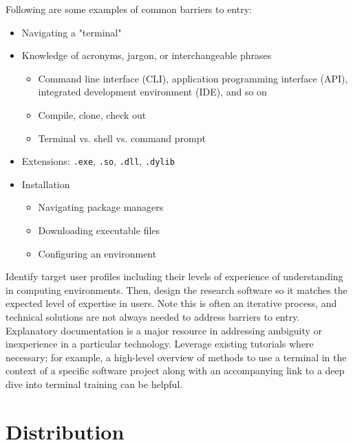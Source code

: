 \documentclass[]{nlr}
\begin{document}
Following are some examples of common barriers to entry:
\begin{itemize}
\item Navigating a "terminal"

\item Knowledge of acronyms, jargon, or interchangeable phrases
\begin{itemize}
\item Command line interface (CLI), application programming interface (API), integrated development environment (IDE), and so on

\item Compile, clone, check out

\item Terminal vs. shell vs. command prompt

\end{itemize}

\item Extensions: \lstinline{.exe}, \lstinline{.so}, \lstinline{.dll}, \lstinline{.dylib}

\item Installation
\begin{itemize}
\item Navigating package managers

\item Downloading executable files

\item Configuring an environment

\end{itemize}

\end{itemize}

Identify target user profiles including their levels of experience of understanding in
computing environments.
Then, design the research software so it matches the expected level of expertise in
users.
Note this is often an iterative process, and technical solutions are not always needed
to address barriers to entry.
Explanatory documentation is a major resource in addressing ambiguity or inexperience in
a particular technology.
Leverage existing tutorials where necessary; for example, a high-level overview of methods
to use a terminal in the context of a specific software project along with an accompanying
link to a deep dive into terminal training can be helpful.

\section{Distribution}
\end{document}
